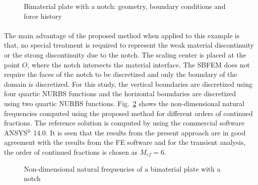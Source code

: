 \begin{figure}[h!]
\begin{subfigure}[b]{0.5\linewidth}
{            }
        \end{subfigure}
        \caption{Bimaterial plate with a notch: geometry, boundary conditions and force history}
        \label{iso_fig:bimaterial_plate_geo_bc}
    \end{figure}

\paragraph{}
The main advantage of the proposed method when applied to this example is that, no special treatment is required to represent the weak material discontinuity or the strong discontinuity due to the notch.
The scaling center is placed at the point $O$, where the notch intersects the material interface.
The SBFEM does not require the faces of the notch to be discretized and only the boundary of the domain is discretized.
For this study, the vertical boundaries are discretized using four quartic NURBS functions and the horizontal boundaries are discretized using two quartic
NURBS functions.
Fig.~\ref{iso_fig:bimaterial_plate_natural_frequencies} shows the non-dimensional natural frequencies computed using the proposed method for different orders of continued fractions.
The reference solution is computed by using the commercial software ANSYS$^\circledR$ 14.0.
It is seen that the results from the present approach are in good agreement with the results from the FE software and for the transient analysis, the order of continued fractions is chosen as $M_{cf} = 6$.
    \begin{figure}[h!]
        \centering
        \caption{Non-dimensional natural frequencies of a bimaterial plate with a notch}
        \label{iso_fig:bimaterial_plate_natural_frequencies}
    \end{figure}


